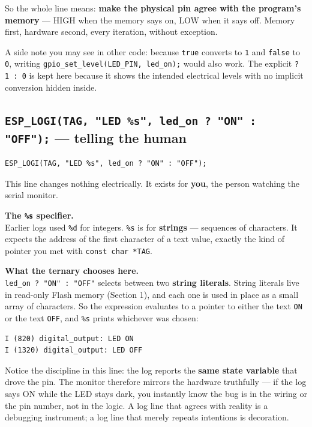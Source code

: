 \documentclass[11pt]{article}
\begin{document}
So the whole line means: \textbf{make the physical pin agree with the program's memory} --- HIGH when the memory says on, LOW when it says off. Memory first, hardware second, every iteration, without exception.

A side note you may see in other code: because \texttt{true} converts to \texttt{1} and \texttt{false} to \texttt{0}, writing \texttt{gpio\_set\_level(LED\_PIN, led\_on);} would also work. The explicit \texttt{? 1 : 0} is kept here because it shows the intended electrical levels with no implicit conversion hidden inside.

\subsection{\texttt{ESP\_LOGI(TAG, "LED \%s", led\_on ? "ON" : "OFF");} --- telling the human}

\begin{verbatim}
ESP_LOGI(TAG, "LED %s", led_on ? "ON" : "OFF");
\end{verbatim}

This line changes nothing electrically. It exists for \textbf{you}, the person watching the serial monitor.

\textbf{The \texttt{\%s} specifier.} \\
Earlier logs used \texttt{\%d} for integers. \texttt{\%s} is for \textbf{strings} --- sequences of characters. It expects the address of the first character of a text value, exactly the kind of pointer you met with \texttt{const char *TAG}.

\textbf{What the ternary chooses here.} \\
\texttt{led\_on ? "ON" : "OFF"} selects between two \textbf{string literals}. String literals live in read-only Flash memory (Section 1), and each one is used in place as a small array of characters. So the expression evaluates to a pointer to either the text \texttt{ON} or the text \texttt{OFF}, and \texttt{\%s} prints whichever was chosen:

\begin{verbatim}
I (820) digital_output: LED ON
I (1320) digital_output: LED OFF
\end{verbatim}

Notice the discipline in this line: the log reports the \textbf{same state variable} that drove the pin. The monitor therefore mirrors the hardware truthfully --- if the log says ON while the LED stays dark, you instantly know the bug is in the wiring or the pin number, not in the logic. A log line that agrees with reality is a debugging instrument; a log line that merely repeats intentions is decoration.
\end{document}
